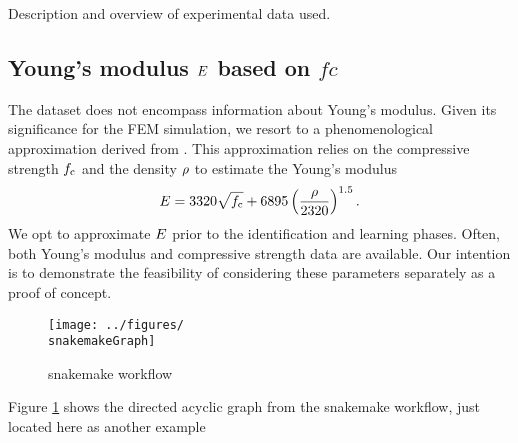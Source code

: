 Description and overview of experimental data used.
\subsection{Young's modulus \texorpdfstring{$E$}{E} based on \texorpdfstring{$fc$}{fc}}
The dataset does not encompass information about Young's modulus. 
Given its significance for  the FEM simulation, we resort to a phenomenological approximation derived from \cite{ACI363}. 
This approximation relies on the compressive strength $f_{\text{c}}$ and the density $\rho$ to estimate the Young's modulus
\begin{align}
	E = 3320 \sqrt{f_{\text{c}}} + 6895 \left( \dfrac{\rho}{2320}\right)^{1.5}.
\end{align}
We opt to approximate $E$ prior to the identification and learning phases. 
Often, both Young's modulus and compressive strength data are available. 
Our intention is to demonstrate the feasibility of considering these parameters separately as a proof of concept.\\

\begin{figure}[ht]%
	\centering
	\texttt{[image: ../figures/\\snakemakeGraph]}
	\caption{snakemake workflow }\label{fig:snakemake_workflow}
\end{figure}
Figure \ref{fig:snakemake_workflow} shows the directed acyclic graph from the snakemake workflow, just located here as another example